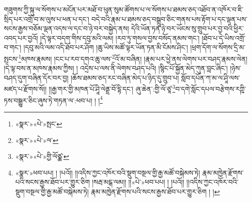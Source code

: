 གཟུགས་ཀྱི་སྐུ་ལ་སོགས་པ་མངོན་པར་མཐོ་བ་ཕུན་སུམ་ཚོགས་པ་ལ་སོགས་པ་ཐམས་ཅད་འཐོབ་ན་འཁོར་བ་ཇི་སྲིད་པར་འགྲོ་བ་མ་ལུས་པ་ཕན་པ་དང་། བདེ་བའི་རྣམ་པ་ཐམས་ཅད་བསྒྲུབ་ཅིང་གནས་པས་རྟོག་པ་དང་ལྡན་པས་སངས་རྒྱས་བཅོམ་ལྡན་འདས་ལ་དང་བ་ཉེ་བར་བསྐྱེད་ནས། དེའི་ཡོན་ཏན་ཉེ་བར་ཡོངས་སུ་གྲུབ་པར་བྱ་བའི་ཕྱིར་འབད་པར་བྱའོ། །དེ་ལྟར་བདག་གིས་དབུ་མའི་ལམ། །རབ་ཏུ་གསལ་བྱས་བསོད་ནམས་གང་། །ཐོབ་པ་དེ་ཡིས་འགྲོ་བ་གང་། །དབུ་མའི་ལམ་འདི་ཐོབ་པར་ཤོག །ཆུ་ཡིས་མཚོ་ལྟར་ཡོན་ཏན་མི་ངོམས་ཤིང་། །ཕྲག་དོག་ལ་སོགས་དྲི་མ་སྤངས་\footnote{«སྣར་»«པེ་»སྤང་}མཁས་རྣམས། །ངང་པ་རབ་དགའ་ཆུ་ལས་\footnote{«སྣར་»«པེ་»ལ་}འོ་མ་བཞིན། །རྣམ་པར་ཕྱེ་ནས་ལེགས་པར་བཤད་རྣམས་ལེན། །དེ་ལྟ་བས་ན་མཁས་རྣམས་ཀྱིས། །
འདྲེས་པ་ལས་ནི་ལེགས་བཤད་པའི། །སྙིང་པོ་སྐྱོན་མེད་ཀུན་བླང་ཞིང་། །ཉེས་བཤད་དུག་བཞིན་དོར་བར་བྱ། །ཆོས་ཐམས་ཅད་རང་བཞིན་མེད་པ་ཉིད་དུ་གྲུབ་པ། སློབ་དཔོན་ཀ་མ་ལ་ཤཱི་ལས་མཛད་པ་རྫོགས་སོ།། །།རྒྱ་གར་གྱི་མཁན་པོ་ཤཱི་ལེནྡྲ་བོ་དྷི་དང་། ཞུ་ཆེན་:གྱི་ལོ་ཙཱ་\footnote{«སྣར་»«པེ་»གྱི་ལོཙྪ་}བ་དགེ་སློང་དཔལ་བརྩེགས་རཀྵི་ཏས་བསྒྱུར་ཅིང་ཞུས་ཏེ་གཏན་ལ་:ཕབ་པ། ། །\footnote{«སྣར་»ཕབ་པཔ། ། །པའོ།། །།འདིས་ཀྱང་འཁོར་བའི་སྡུག་བསྔལ་གྱི་རྒྱ་མཚོ་བསྐེམས་ཏེ། རྣམ་མཁྱེན་རྫོགས་པའི་སངས་རྒྱས་ཐོབ་པར་གྱུར་ཅིག །སརྦ་མངྒ་ལམ།། །།«པེ་»ཕབ་པཔ། ། །པའོ།། །།འདིས་ཀྱང་འཁོར་བའི་སྡུག་བསྔལ་གྱི་རྒྱ་མཚོ་བསྐེམས་ཏེ། རྣམ་མཁྱེན་རྫོགས་པའི་སངས་རྒྱས་ཐོབ་པར་གྱུར་ཅིག ། །}